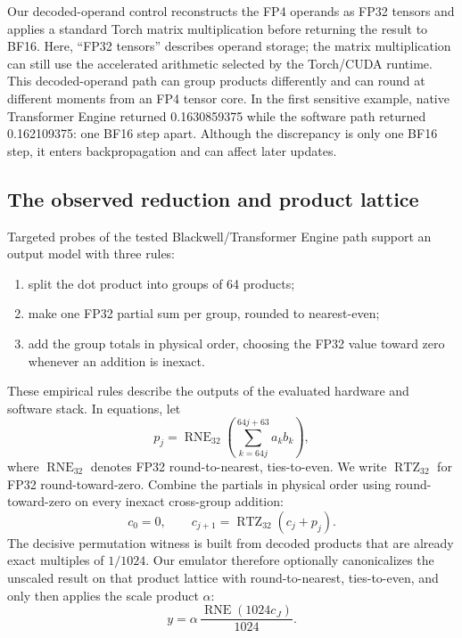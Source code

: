 \documentclass[11pt]{article}
\begin{document}
Our decoded-operand control reconstructs the FP4 operands as FP32 tensors and
applies a standard Torch matrix multiplication before returning the result to
BF16.  Here, ``FP32 tensors'' describes operand storage; the matrix
multiplication can still use the accelerated arithmetic selected by the
Torch/CUDA runtime.  This
decoded-operand path can group products differently and can round at different moments
from an FP4 tensor core.  In the first
sensitive example, native Transformer Engine returned 0.1630859375 while the
software path returned 0.162109375: one BF16 step apart.  Although the
discrepancy is only one BF16 step, it enters backpropagation and can affect
later updates.

\subsection{The observed reduction and product lattice}

Targeted probes of the tested Blackwell/Transformer Engine path support an
output model with three rules:

\begin{enumerate}
  \item split the dot product into groups of 64 products;
  \item make one FP32 partial sum per group, rounded to nearest-even;
  \item add the group totals in physical order, choosing the FP32 value toward
        zero whenever an addition is inexact.
\end{enumerate}

These empirical rules describe the outputs of the evaluated hardware and
software stack.  In equations, let
\begin{equation}
  p_j = \operatorname{RNE}_{32}
  \left(\sum_{k=64j}^{64j+63} a_kb_k\right),
  \label{eq:issue-partial}
\end{equation}
where $\operatorname{RNE}_{32}$ denotes FP32 round-to-nearest, ties-to-even.
We write $\operatorname{RTZ}_{32}$ for FP32 round-toward-zero.  Combine the partials in physical order using round-toward-zero on every
inexact cross-group addition:
\begin{equation}
  c_0=0,
  \qquad
  c_{j+1}=\operatorname{RTZ}_{32}(c_j+p_j).
  \label{eq:issue-rz}
\end{equation}
The decisive permutation witness is built from decoded products that are
already exact multiples of $1/1024$.  Our emulator therefore optionally
canonicalizes the unscaled result on that product lattice with
round-to-nearest, ties-to-even, and only then applies the scale product $\alpha$:
\begin{equation}
  y = \alpha\,
  \frac{\operatorname{RNE}(1024c_J)}{1024}.
  \label{eq:final-grid}
\end{equation}
\end{document}
